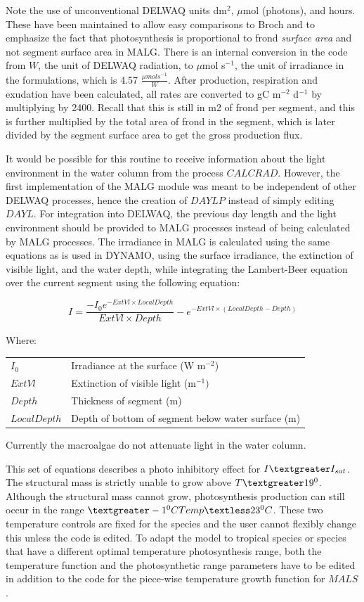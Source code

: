 \documentclass{deltares_manual}
\begin{document}
Note the use of unconventional DELWAQ units dm$^{2}$, $\mu$mol (photons), and hours. These have been maintained to allow easy comparisons to Broch and to emphasize the fact that photosynthesis is proportional to frond \textit{surface area} and not segment surface area in MALG. There is an internal conversion in the code from $W$, the unit of DELWAQ radiation, to $\mu$mol s$^{-1}$, the unit of irradiance in the formulations, which is 4.57 $\frac{\mu mol s^{-1}}{W}$. After production, respiration and exudation have been calculated, all rates are converted to gC m$^{-2}$ d$^{-1}$ by multiplying by 2400. Recall that this is still in m2 of frond per segment, and this is further multiplied by the total area of frond in the segment, which is later divided by the segment surface area to get the gross production flux.

It would be possible for this routine to receive information about the light environment in the water column from the process $CALCRAD$. However, the first implementation of the MALG module was meant to be independent of other DELWAQ processes, hence the creation of $DAYLP$ instead of simply editing $DAYL$. For integration into DELWAQ, the previous day length and the light environment should be provided to MALG processes instead of being calculated by MALG processes. The irradiance in MALG is calculated using the same equations as is used in DYNAMO, using the surface irradiance, the extinction of visible light, and the water depth, while integrating the Lambert-Beer equation over the current segment using the following equation:

\begin{equation}
I = \frac{-I_{0}e^{-ExtVl \times LocalDepth}}{ExtVl \times Depth}  - e^{-ExtVl \times (LocalDepth - Depth)}
\end{equation}

Where:\\
\begin{tabular}{ll}
$I_{0}$ & Irradiance at the surface (W m$^{-2}$)\\
$ExtVl$ & Extinction of visible light (m$^{-1})$\\
$Depth$ & Thickness of segment (m)\\
$LocalDepth$ & Depth of bottom of segment below water surface (m)\\
\end{tabular}

Currently the macroalgae do not attenuate light in the water column.

This set of equations describes a photo inhibitory effect for $I\textgreater I_{sat}$. The structural mass is strictly unable to grow above $T \textgreater 19^{0}$. Although the structural mass cannot grow, photosynthesis production can still occur in the range $\textgreater -1^{0}C Temp \textless 23^{0}C$. These two temperature controls are fixed for the species and the user cannot flexibly change this unless the code is edited. To adapt the model to tropical species or species that have a different optimal temperature photosynthesis range, both the temperature function and the photosynthetic range parameters have to be edited in addition to the code for the piece-wise temperature growth function for $MALS$.
\end{document}
